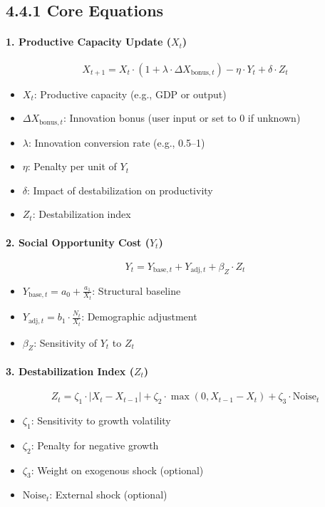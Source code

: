 \documentclass[12pt]{report}
\begin{document}
\subsection{4.4.1 Core Equations}

\paragraph{1. Productive Capacity Update ($X_t$)}
\begin{equation}
X_{t+1} = X_t \cdot \left(1 + \lambda \cdot \Delta X_{\text{bonus},t} \right) - \eta \cdot Y_t + \delta \cdot Z_t
\end{equation}
\begin{itemize}
  \item $X_t$: Productive capacity (e.g., GDP or output)
  \item $\Delta X_{\text{bonus},t}$: Innovation bonus (user input or set to 0 if unknown)
  \item $\lambda$: Innovation conversion rate (e.g., 0.5–1)
  \item $\eta$: Penalty per unit of $Y_t$
  \item $\delta$: Impact of destabilization on productivity
  \item $Z_t$: Destabilization index
\end{itemize}

\vspace{0.5em}
\paragraph{2. Social Opportunity Cost ($Y_t$)}
\begin{equation}
Y_t = Y_{\text{base},t} + Y_{\text{adj},t} + \beta_Z \cdot Z_t
\end{equation}
\begin{itemize}
  \item $Y_{\text{base},t} = a_0 + \frac{a_1}{X_t}$: Structural baseline
  \item $Y_{\text{adj},t} = b_1 \cdot \frac{N_t}{X_t}$: Demographic adjustment
  \item $\beta_Z$: Sensitivity of $Y_t$ to $Z_t$
\end{itemize}

\vspace{0.5em}
\paragraph{3. Destabilization Index ($Z_t$)}
\begin{equation}
Z_t = \zeta_1 \cdot |X_t - X_{t-1}| + \zeta_2 \cdot \max(0, X_{t-1} - X_t) + \zeta_3 \cdot \text{Noise}_t
\end{equation}
\begin{itemize}
  \item $\zeta_1$: Sensitivity to growth volatility
  \item $\zeta_2$: Penalty for negative growth
  \item $\zeta_3$: Weight on exogenous shock (optional)
  \item $\text{Noise}_t$: External shock (optional)
\end{itemize}
\end{document}

